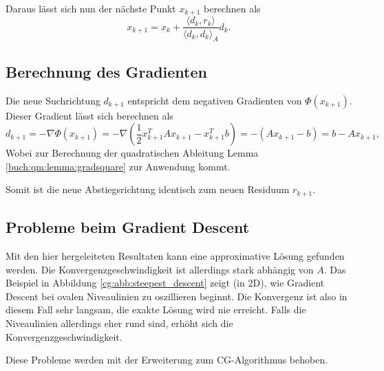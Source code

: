 Daraus lässt sich nun der nächste Punkt $x_{k+1}$ berechnen als
\begin{equation}
	x_{k+1} = x_k + \frac{\langle d_k , r_k \rangle}{\langle d_k , d_k \rangle_A} d_k.
\end{equation}

\subsection{Berechnung des Gradienten}
Die neue Suchrichtung $d_{k+1}$ entspricht dem negativen Gradienten von $\Phi(x_{k+1})$.
Dieser Gradient lässt sich berechnen als
\begin{equation}
	d_{k+1} = - \nabla \Phi(x_{k+1}) = - \nabla \left( \frac{1}{2} x_{k+1}^T A x_{k+1} - x_{k+1}^T b \right) = -(Ax_{k+1} - b) = b - Ax_{k+1},
\end{equation}
Wobei zur Berechnung der quadratischen Ableitung Lemma \ref{buch:qm:lemma:gradsquare} zur Anwendung kommt.
\begin{beobachtung} \label{cg:beob:residuum}
	Somit ist die neue Abstiegsrichtung identisch zum neuen Residuum $r_{k+1}$.
\end{beobachtung}

\subsection{Probleme beim Gradient Descent}
Mit den hier hergeleiteten Resultaten kann eine approximative Lösung gefunden werden.
Die Konvergenzgeschwindigkeit ist allerdings stark abhängig von $A$.
Das Beispiel in Abbildung \ref{cg:abb:steepest_descent} zeigt (in 2D), wie Gradient Descent bei ovalen Niveaulinien zu oszillieren beginnt.
Die Konvergenz ist also in diesem Fall sehr langsam, die exakte Lösung wird nie erreicht.
Falls die Niveaulinien allerdings eher rund sind, erhöht sich die Konvergenzgeschwindigkeit.

Diese Probleme werden mit der Erweiterung zum CG-Algorithmus behoben.

